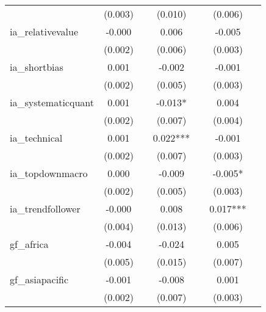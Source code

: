 {\begin{tabular}{l*{6}{c}}
            &     (0.003)   &               &     (0.010)   &               &     (0.006)   &               \\
[1em]
ia\_relativevalue&      -0.000   &               &       0.006   &               &      -0.005   &               \\
            &     (0.002)   &               &     (0.006)   &               &     (0.003)   &               \\
[1em]
ia\_shortbias&       0.001   &               &      -0.002   &               &      -0.001   &               \\
            &     (0.002)   &               &     (0.005)   &               &     (0.003)   &               \\
[1em]
ia\_systematicquant&       0.001   &               &      -0.013*  &               &       0.004   &               \\
            &     (0.002)   &               &     (0.007)   &               &     (0.004)   &               \\
[1em]
ia\_technical&       0.001   &               &       0.022***&               &      -0.001   &               \\
            &     (0.002)   &               &     (0.007)   &               &     (0.003)   &               \\
[1em]
ia\_topdownmacro&       0.000   &               &      -0.009   &               &      -0.005*  &               \\
            &     (0.002)   &               &     (0.005)   &               &     (0.003)   &               \\
[1em]
ia\_trendfollower&      -0.000   &               &       0.008   &               &       0.017***&               \\
            &     (0.004)   &               &     (0.013)   &               &     (0.006)   &               \\
[1em]
gf\_africa   &      -0.004   &               &      -0.024   &               &       0.005   &               \\
            &     (0.005)   &               &     (0.015)   &               &     (0.007)   &               \\
[1em]
gf\_asiapacific&      -0.001   &               &      -0.008   &               &       0.001   &               \\
            &     (0.002)   &               &     (0.007)   &               &     (0.003)   &               \\

\end{tabular}}
